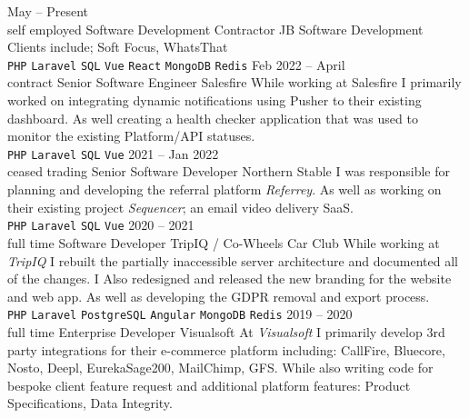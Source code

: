 \documentclass[9pt]{cv}
\begin{document}


\begin{entrylist}
	\entry
		{May -- Present\\\footnotesize{self employed}}
		{Software Development Contractor}
		{JB Software Development}
		{Clients include; Soft Focus, WhatsThat\\
		\texttt{PHP}\slashsep
		\texttt{Laravel}\slashsep
		\texttt{SQL}\slashsep
		\texttt{Vue}\slashsep
		\texttt{React}\slashsep
		\texttt{MongoDB}\slashsep
		\texttt{Redis}}
	\entry
	    {Feb 2022 -- April\\\footnotesize{contract}}
		{Senior Software Engineer}
		{Salesfire}
		{While working at Salesfire I primarily worked on integrating dynamic notifications using Pusher to their existing dashboard. As well creating a health checker application that was used to monitor the existing Platform/API statuses.\\
		\texttt{PHP}\slashsep
		\texttt{Laravel}\slashsep
		\texttt{SQL}\slashsep
		\texttt{Vue}}
	\entry
		{2021 -- Jan 2022\\\footnotesize{ceased trading}}
		{Senior Software Developer}
		{Northern Stable}
		{I was responsible for planning and developing the referral platform \textit{Referrey}. As well as working on their existing project \textit{Sequencer}; an email video delivery SaaS.\\
		\texttt{PHP}\slashsep
		\texttt{Laravel}\slashsep
		\texttt{SQL}\slashsep
		\texttt{Vue}}
	\entry
		{2020 -- 2021\\\footnotesize{full time}}
		{Software Developer}
		{TripIQ / Co-Wheels Car Club}
		{While working at \textit{TripIQ} I rebuilt the partially inaccessible server architecture and documented all of the changes. I Also redesigned and released the new branding for the website and web app. As well as developing the GDPR removal and export process.\\
		\texttt{PHP}\slashsep
		\texttt{Laravel}\slashsep
		\texttt{PostgreSQL}\slashsep
		\texttt{Angular}\slashsep
		\texttt{MongoDB}\slashsep
		\texttt{Redis}}
	\entry
		{2019 -- 2020\\\footnotesize{full time}}
		{Enterprise Developer}
		{Visualsoft}
		{At \textit{Visualsoft} I primarily develop 3rd party integrations for their e-commerce platform including: CallFire, Bluecore, Nosto, Deepl, EurekaSage200, MailChimp, GFS. While also writing code for bespoke client feature request and additional platform features: Product Specifications, Data Integrity.\\
}
\end{entrylist}
\end{document}
